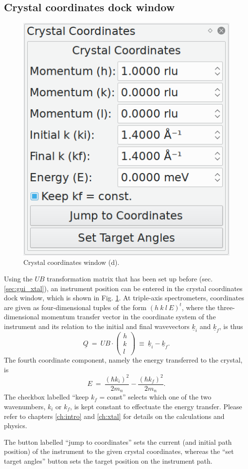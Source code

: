 \subsection{Crystal coordinates dock window}
\label{sec:gui_xtalcoords}
\begin{minipage}{1 \textwidth}
\setlength{\intextsep}{0.25cm}
\begin{figure}
	\vspace{-0.25cm}
	\includegraphics[width = 0.25 \textwidth]{figures/gui_xtalcoords}
	\caption[Crystal coordinates window.]{Crystal coordinates window (d).
		\label{fig:gui_xtalcoords}}
\end{figure}

Using the $UB$ transformation matrix that has been set up before (sec. \ref{sec:gui_xtal}),
an instrument position can be entered in the crystal coordinates dock window, which is
shown in Fig. \ref{fig:gui_xtalcoords}.
At triple-axis spectrometers, coordinates are given as four-dimensional tuples of the
form $\left(h\  k\  l\  E \right)^t$, where the three-dimensional momentum transfer
vector in the coordinate system of the instrument and its relation to the initial and final
wavevectors $\underline{k}_i$ and $\underline{k}_f$, is thus \cite[p. 11]{Shirane2002} \cite{Lumsden2005}
\begin{equation}
	\underline{Q}\ =\ UB\cdot \left(\begin{array}{c} h \\ k \\ l \end{array}\right) \ \equiv\ \underline{k}_i - \underline{k}_f.
\end{equation}
The fourth coordinate component, namely the energy transferred to the crystal, is \cite[p. 11]{Shirane2002}
\begin{equation}
	E \ =\ \frac{\left( \hbar k_i \right)^2}{2 m_n} - \frac{\left( \hbar k_f \right)^2}{2 m_n}.
\end{equation}
The checkbox labelled ``keep $k_f$ = const'' selects which one of the two wavenumbers, $k_i$ or $k_f$,
is kept constant to effectuate the energy transfer.
Please refer to chapters \ref{ch:intro} and \ref{ch:xtal} for details on the calculations and physics.

The button labelled ``jump to coordinates'' sets the current (and initial path position)
of the instrument to the given crystal coordinates, whereas the ``set target angles'' button
sets the target position on the instrument path.

\end{minipage}




